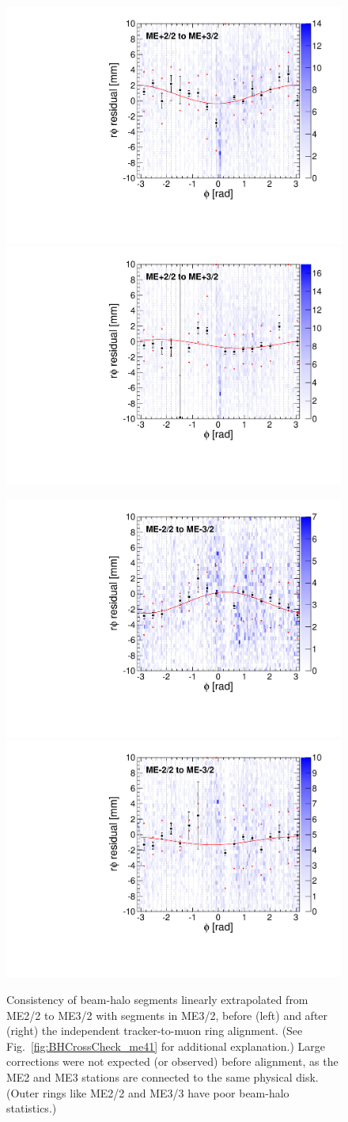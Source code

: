 \documentclass[12pt]{article}
\begin{document}
\begin{figure}
\begin{center}
\includegraphics[width=0.4\linewidth]{BHCrossCheck_mep32_before.pdf}
\includegraphics[width=0.4\linewidth]{BHCrossCheck_mep32_after.pdf}

\includegraphics[width=0.4\linewidth]{BHCrossCheck_mem32_before.pdf}
\includegraphics[width=0.4\linewidth]{BHCrossCheck_mem32_after.pdf}
\end{center}

\caption{Consistency of beam-halo segments linearly extrapolated from
  ME2/2 to ME3/2 with segments in ME3/2, before (left) and after
  (right) the independent tracker-to-muon ring alignment.  (See
  Fig.~\ref{fig:BHCrossCheck_me41} for additional explanation.)  Large
  corrections were not expected (or observed) before alignment, as the
  ME2 and ME3 stations are connected to the same physical disk.
  (Outer rings like ME2/2 and ME3/3 have poor beam-halo
  statistics.) \label{fig:BHCrossCheck_me32}}
\end{figure}
\end{document}
